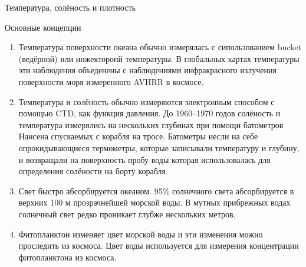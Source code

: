 \begin{chapter}{Температура, солёность и плотность}
\begin{section}{Основные концепции}
\begin{enumerate}
\item
Температура поверхности океана обычно измерялась с сипользованием
bucket (ведёрной) или инжекторонй температуры. В глобальных картах
температуры эти наблюдения объеденены с наблюдениями инфракрасного
излучения поверхности моря измеренного AVHRR в космосе.
%

\item
Температура и солёность обычно измеряются электронным способом с
помощью CTD, как функция давления. До 1960--1970 годов солёность и
температура измерялись на нескольких глубинах при помощи батометров
Нансена спускаемых с корабля на тросе. Батометры несли на себе
опрокидывающиеся термометры, которые записывали температуру и глубину,
и возвращали на поверхность пробу воды которая использовалась для
определения солёности на борту корабля.
%


\item
Свет быстро абсорбируется океаном. 95\% солнечного света абсорбируется
в верхних 100 м прозрачнейшей морской воды. В мутных прибрежных водах
солнечный свет редко проникает глубже нескольких метров.
%

\item
Фитопланктон изменяет цвет морской воды и эти изменения можно
проследить из космоса. Цвет воды используется для измерения
концентрации фитопланктона из космоса.
%
\end{enumerate}
\end{section}
\end{chapter}
